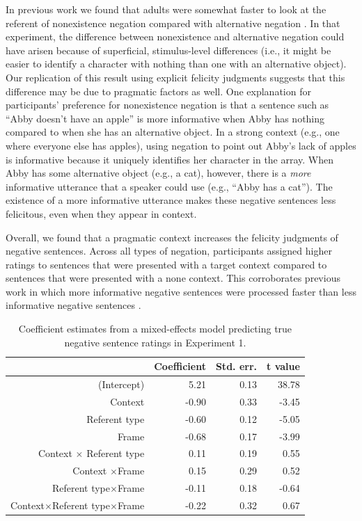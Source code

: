 \documentclass[man, noapacite]{apa2}
\begin{document}
In previous work we found that adults were somewhat faster to look at the referent of nonexistence negation compared with alternative negation \cite{nordmeyer2014b}. In that experiment, the difference between nonexistence and alternative negation could have arisen because of superficial, stimulus-level differences (i.e., it might be easier to identify a character with nothing than one with an alternative object). Our replication of this result using explicit felicity judgments suggests that this difference may be due to pragmatic factors as well. One explanation for participants' preference for nonexistence negation is that a sentence such as ``Abby doesn't have an apple'' is more informative when Abby has nothing compared to when she has an alternative object. In a strong context (e.g., one where everyone else has apples), using negation to point out Abby's lack of apples is informative because it uniquely identifies her character in the array. When Abby has some alternative object (e.g., a cat), however, there is a \emph{more} informative utterance that a speaker could use (e.g., ``Abby has a cat''). The existence of a more informative utterance makes these negative sentences less felicitous, even when they appear in context.

Overall, we found that a pragmatic context increases the felicity judgments of negative sentences. Across all types of negation, participants assigned higher ratings to sentences that were presented with a target context compared to sentences that were presented with a none context. This corroborates previous work in which more informative negative sentences were processed faster than less informative negative sentences \cite{nordmeyer2014}.

\begin{table}[t]
\caption{\label{tab:s1} Coefficient estimates from a mixed-effects model predicting true negative sentence ratings in Experiment 1.}
\begin{center}
\small\addtolength{\tabcolsep}{-5pt}
\begin{tabular}{rrrr}
 \hline
 & Coefficient & Std. err. & t value \\
 \hline
(Intercept) & 5.21 & 0.13 & 38.78 \\
 Context & -0.90 & 0.33 & -3.45 \\
 Referent type & -0.60 & 0.12 & -5.05 \\
 Frame & -0.68 & 0.17 & -3.99 \\
 Context $\times$ Referent type & 0.11 & 0.19 & 0.55 \\
 Context $\times$Frame & 0.15 & 0.29 & 0.52 \\
 Referent type$\times$Frame & -0.11 & 0.18 & -0.64 \\
 Context$\times$Referent type$\times$Frame & -0.22 & 0.32 & 0.67 \\
  \hline
\end{tabular}
\end{center}
\end{table}
\end{document}
